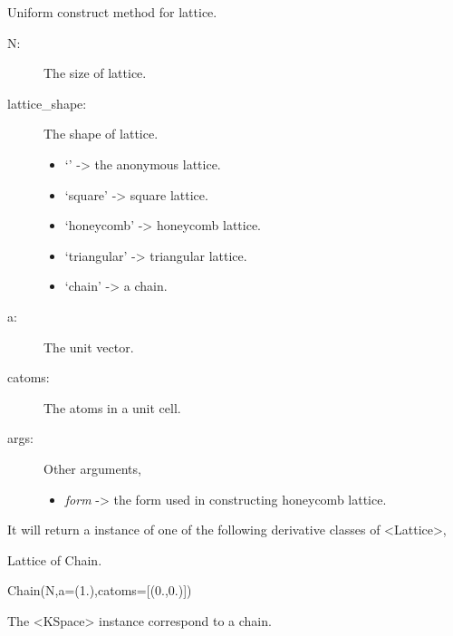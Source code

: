 \documentclass[letterpaper,10pt,oneside,openany]{sphinxmanual}
\begin{document}
\begin{fulllineitems}
\label{index:lattice.latticelib.construct_lattice}
Uniform construct method for lattice.
\begin{description}
\item[{N:}] \leavevmode
The size of lattice.

\item[{lattice\_shape:}] \leavevmode
The shape of lattice.
\begin{itemize}
\item {} 
`'            -\textgreater{} the anonymous lattice.

\item {} 
`square'      -\textgreater{} square lattice.

\item {} 
`honeycomb'   -\textgreater{} honeycomb lattice.

\item {} 
`triangular'  -\textgreater{} triangular lattice.

\item {} 
`chain'       -\textgreater{} a chain.

\end{itemize}

\item[{a:}] \leavevmode
The unit vector.

\item[{catoms:}] \leavevmode
The atoms in a unit cell.

\item[{args:}] \leavevmode
Other arguments,
\begin{itemize}
\item {} 
\emph{form} -\textgreater{} the form used in constructing honeycomb lattice.

\end{itemize}

\end{description}

\end{fulllineitems}


It will return a instance of one of the following derivative classes of \textless{}Lattice\textgreater{},

\begin{fulllineitems}
\label{index:lattice.latticelib.Chain}
Lattice of Chain.

Chain(N,a=(1.),catoms={[}(0.,0.){]})

\begin{fulllineitems}
\label{index:lattice.latticelib.Chain.kspace}
The \textless{}KSpace\textgreater{} instance correspond to a chain.

\end{fulllineitems}


\end{fulllineitems}
\end{document}
